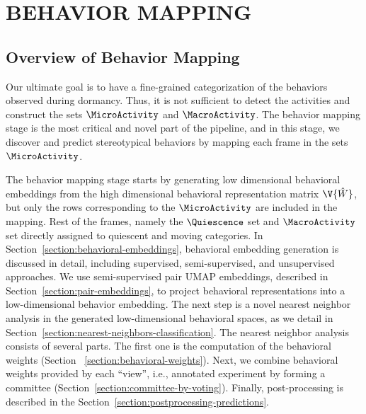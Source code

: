 \setlength{\parindent}{0pt}
\chapter{\bf BEHAVIOR MAPPING}\label{chapter:behavior-mapping}
\section{Overview of Behavior Mapping}
Our ultimate goal is to have a fine-grained categorization of the behaviors observed during dormancy. Thus, it is not sufficient to detect the activities and construct the sets $\MicroActivity$ and $\MacroActivity$. The behavior mapping stage is the most critical and novel part of the pipeline, and in this stage, we discover and predict stereotypical behaviors by mapping each frame in the sets $\MicroActivity$.

The behavior mapping stage starts by generating low dimensional behavioral embeddings from the high dimensional behavioral representation matrix $\V{\hat{W}}$, but only the rows corresponding to the $\MicroActivity$ are included in the mapping.
Rest of the frames, namely the $\Quiescence$ set and $\MacroActivity$ set directly assigned to quiescent and moving categories.
In Section~\ref{section:behavioral-embeddings}, behavioral embedding generation is discussed in detail, including supervised, semi-supervised, and unsupervised approaches.
We use semi-supervised pair UMAP embeddings, described in Section~\ref{section:pair-embeddings}, to project behavioral representations into a low-dimensional behavior embedding.
The next step is a novel nearest neighbor analysis in the generated low-dimensional behavioral spaces, as we detail in Section~\ref{section:nearest-neighbors-classification}.
The nearest neighbor analysis consists of several parts.
The first one is the computation of the behavioral weights (Section ~\ref{section:behavioral-weights}).
Next, we combine behavioral weights provided by each ``view'', i.e., annotated experiment by forming a committee (Section~\ref{section:committee-by-voting}).
Finally, post-processing is described in the Section~\ref{section:postprocessing-predictions}.

